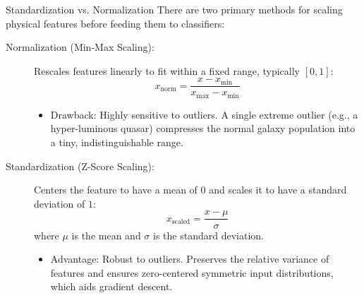 \documentclass[9pt]{beamer}
\begin{document}
\begin{frame}{Standardization vs. Normalization}
  There are two primary methods for scaling physical features before feeding them to classifiers:
  \begin{description}
    \item[Normalization (Min-Max Scaling):]
      Rescales features linearly to fit within a fixed range, typically $[0, 1]$:
      $$x_{\text{norm}} = \frac{x - x_{\text{min}}}{x_{\text{max}} - x_{\text{min}}}$$
      \begin{itemize}
        \item \alert{Drawback:} Highly sensitive to outliers. A single extreme outlier (e.g., a hyper-luminous quasar) compresses the normal galaxy population into a tiny, indistinguishable range.
      \end{itemize}
    \item[Standardization (Z-Score Scaling):]
      Centers the feature to have a mean of $0$ and scales it to have a standard deviation of $1$:
      $$x_{\text{scaled}} = \frac{x - \mu}{\sigma}$$
      where $\mu$ is the mean and $\sigma$ is the standard deviation.
      \begin{itemize}
        \item \alert{Advantage:} Robust to outliers. Preserves the relative variance of features and ensures zero-centered symmetric input distributions, which aids gradient descent.
      \end{itemize}
  \end{description}
\end{frame}
\end{document}
